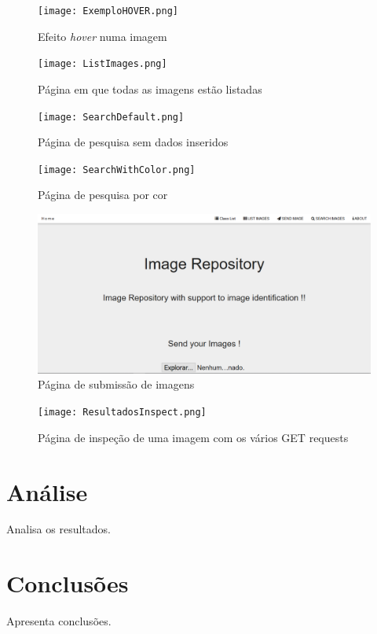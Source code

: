 \documentclass{report}
\begin{document}
\begin{figure}[h]
\texttt{[image: ExemploHOVER.png]}
\caption{Efeito \textit{hover} numa imagem}
\label{Fig4}
\end{figure}

\begin{figure}[h]
\texttt{[image: ListImages.png]}
\caption{Página em que todas as imagens estão listadas}
\label{Fig5}
\end{figure}

\begin{figure}[h]
\texttt{[image: SearchDefault.png]}
\caption{Página de pesquisa sem dados inseridos}
\label{Fig6}
\end{figure}

\begin{figure}[h]
\texttt{[image: SearchWithColor.png]}
\caption{Página de pesquisa por cor}
\label{Fig7}
\end{figure}

\begin{figure}[h]
\includegraphics[width=\textwidth]{Send.png}
\caption{Página de submissão de imagens}
\label{Fig8}
\end{figure}

\begin{figure}[h]
\texttt{[image: ResultadosInspect.png]}
\caption{Página de inspeção de uma imagem com os vários GET requests}
\label{Fig9}
\end{figure}

\chapter{Análise}
\label{chap.analise}
Analisa os resultados.

\chapter{Conclusões}
\label{chap.conclusao}
Apresenta conclusões.
\end{document}
